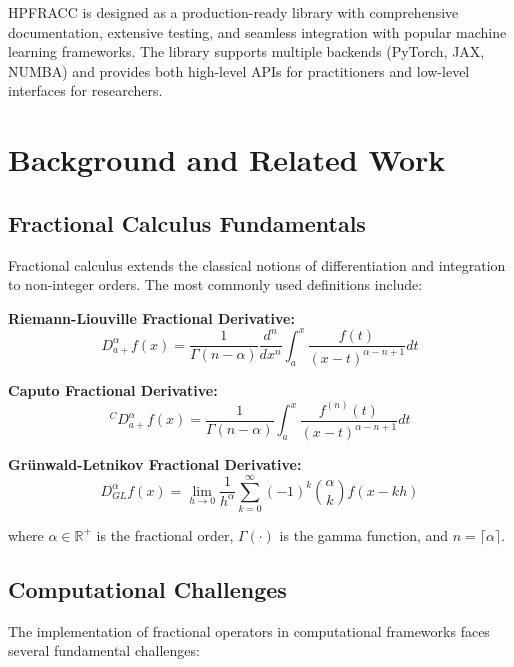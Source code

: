 \documentclass[12pt]{article}
\begin{document}
HPFRACC is designed as a production-ready library with comprehensive documentation, extensive testing, and seamless integration with popular machine learning frameworks. The library supports multiple backends (PyTorch, JAX, NUMBA) and provides both high-level APIs for practitioners and low-level interfaces for researchers.

\section{Background and Related Work}

\subsection{Fractional Calculus Fundamentals}

Fractional calculus extends the classical notions of differentiation and integration to non-integer orders. The most commonly used definitions include:

\textbf{Riemann-Liouville Fractional Derivative:}
\begin{equation}
D^{\alpha}_{a+}f(x) = \frac{1}{\Gamma(n-\alpha)} \frac{d^n}{dx^n} \int_a^x \frac{f(t)}{(x-t)^{\alpha-n+1}} dt
\end{equation}

\textbf{Caputo Fractional Derivative:}
\begin{equation}
^C D^{\alpha}_{a+}f(x) = \frac{1}{\Gamma(n-\alpha)} \int_a^x \frac{f^{(n)}(t)}{(x-t)^{\alpha-n+1}} dt
\end{equation}

\textbf{Grünwald-Letnikov Fractional Derivative:}
\begin{equation}
D^{\alpha}_{GL}f(x) = \lim_{h \to 0} \frac{1}{h^{\alpha}} \sum_{k=0}^{\infty} (-1)^k \binom{\alpha}{k} f(x-kh)
\end{equation}

where $\alpha \in \mathbb{R}^+$ is the fractional order, $\Gamma(\cdot)$ is the gamma function, and $n = \lceil \alpha \rceil$.

\subsection{Computational Challenges}

The implementation of fractional operators in computational frameworks faces several fundamental challenges:
\end{document}
